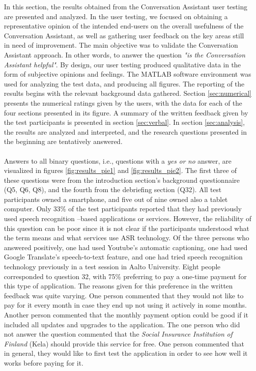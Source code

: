\documentclass[english, 12pt, a4paper, pdftex, elec, utf8]{aaltothesis}
\begin{document}
In this section, the results obtained from the Conversation Assistant user testing are presented and analyzed. In the user testing, we focused on obtaining a representative opinion of the intended end-users on the overall usefulness of the Conversation Assistant, as well as gathering user feedback on the key areas still in need of improvement. The main objective was to validate the Conversation Assistant approach. In other words, to answer the question \textit{"is the Conversation Assistant helpful"}. By design, our user testing produced qualitative data in the form of subjective opinions and feelings. The MATLAB software environment was used for analyzing the test data, and producing all figures. The reporting of the results begins with the relevant background data gathered. Section \ref{sec:numerical} presents the numerical ratings given by the users, with the data for each of the four sections presented in its figure. A summary of the written feedback given by the test participants is presented in section \ref{sec:verbal}. In section \ref{sec:analysis}, the results are analyzed and interpreted, and the research questions presented in the beginning are tentatively answered. \\\\
Answers to all binary questions, i.e., questions with a \textit{yes or no} answer, are visualized in figures \ref{fig:results_pie1} and \ref{fig:results_pie2}. The first three of these questions were from the introduction section's background questionnaire (Q5, Q6, Q8), and the fourth from the debriefing section (Q32). All test participants owned a smartphone, and five out of nine owned also a tablet computer. Only 33\% of the test participants reported that they had previously used speech recognition --based applications or services. However, the reliability of this question can be poor since it is not clear if the participants understood what the term means and what services use ASR technology. Of the three persons who answered positively, one had used Youtube's automatic captioning, one had used Google Translate's speech-to-text feature, and one had tried speech recognition technology previously in a test session in Aalto University. Eight people corresponded to question 32, with 75\% preferring to pay a one-time payment for this type of application. The reasons given for this preference in the written feedback was quite varying. One person commented that they would not like to pay for it every month in case they end up not using it actively in some months. Another person commented that the monthly payment option could be good if it included all updates and upgrades to the application. The one person who did not answer the question commented that the \textit{Social Insurance Institution of Finland} (Kela) should provide this service for free. One person commented that in general, they would like to first test the application in order to see how well it works before paying for it.
\end{document}
